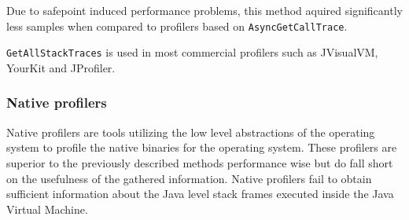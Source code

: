 \documentclass[..thesis.tex]{subfiles}
\begin{document}
Due to safepoint induced performance problems, this method aquired significantly less samples when compared to profilers based on \texttt{Async\-Get\-Call\-Trace}.

\texttt{GetAllStackTraces} is used in most commercial profilers such as JVisualVM, YourKit and JProfiler. \cite{visualvm} \cite{wakart_psychosomatic_2016}

\subsubsection{Native profilers}
Native profilers are tools utilizing the low level abstractions of the operating system to  profile the native binaries for the operating system. These profilers are superior to the previously described methods performance wise but do fall short on the usefulness of the gathered information. Native profilers fail to obtain sufficient information about the Java level stack frames executed inside the Java Virtual Machine. 
\end{document}
